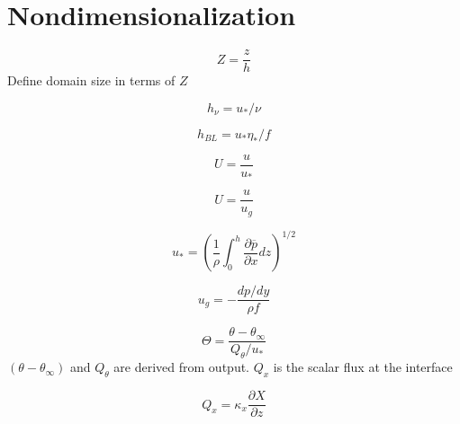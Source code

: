     \section{Nondimensionalization}
    
    \begin{equation}
        Z = \frac{z}{h}
    \end{equation}
    Define domain size in terms of $Z$
    
    \begin{equation}
        h_{\nu} = u_*/\nu
    \end{equation}
    
    \begin{equation}
        h_{BL} = u_* \eta_*/f
    \end{equation}
    
    \begin{equation}
        U = \frac{u}{u_*}
    \end{equation}
    
    \begin{equation}
        U = \frac{u}{u_g}
    \end{equation}
    
    \begin{equation}
        u_* = (\frac{1}{\rho}\int_0^h \frac{\partial \overline{p}}{\partial x} dz)^{1/2} 
    \end{equation}
    
    \begin{equation}
        u_g = - \frac{dp/dy}{\rho f}
    \end{equation}

    \begin{equation}
        \Theta = \frac{\theta - \theta_\infty}{Q_\theta/u_*}
    \end{equation}
    $(\theta - \theta_\infty)$ and $Q_\theta$ are derived from output. $Q_x$ is the scalar flux at the interface
    
    \begin{equation}
        Q_x = \kappa_x \frac{\partial X}{\partial z}
    \end{equation}

	